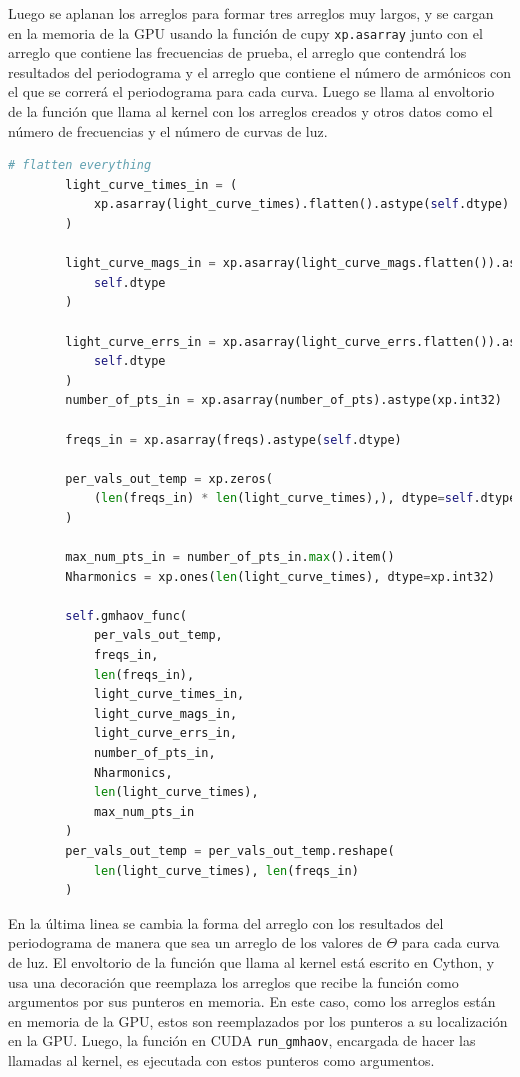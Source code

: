 Luego se aplanan los arreglos para formar tres arreglos muy largos, y se cargan en la memoria de la GPU usando la función de cupy \texttt{xp.asarray} junto con el arreglo que contiene las frecuencias de prueba, el arreglo que contendrá los resultados del periodograma y el arreglo que contiene el número de armónicos con el que se correrá el periodograma para cada curva. Luego se llama al envoltorio de la función que llama al kernel con los arreglos creados y otros datos como el número de frecuencias y el número de curvas de luz.
\begin{lstlisting}[language=Python]
        # flatten everything
        light_curve_times_in = (
            xp.asarray(light_curve_times).flatten().astype(self.dtype)
        )

        light_curve_mags_in = xp.asarray(light_curve_mags.flatten()).astype(
            self.dtype
        )

        light_curve_errs_in = xp.asarray(light_curve_errs.flatten()).astype(
            self.dtype
        )
        number_of_pts_in = xp.asarray(number_of_pts).astype(xp.int32)

        freqs_in = xp.asarray(freqs).astype(self.dtype)

        per_vals_out_temp = xp.zeros(
            (len(freqs_in) * len(light_curve_times),), dtype=self.dtype
        )

        max_num_pts_in = number_of_pts_in.max().item()
        Nharmonics = xp.ones(len(light_curve_times), dtype=xp.int32)

        self.gmhaov_func(
            per_vals_out_temp,
            freqs_in,
            len(freqs_in),
            light_curve_times_in,
            light_curve_mags_in,
            light_curve_errs_in,
            number_of_pts_in,
            Nharmonics,
            len(light_curve_times),
            max_num_pts_in
        )
        per_vals_out_temp = per_vals_out_temp.reshape(
            len(light_curve_times), len(freqs_in)
        )
\end{lstlisting}
En la última linea se cambia la forma del arreglo con los resultados del periodograma de manera que sea un arreglo de los valores de $\Theta$ para cada curva de luz.
El envoltorio de la función que llama al kernel está escrito en Cython, y usa una decoración que reemplaza los arreglos que recibe la función como argumentos por sus punteros en memoria. En este caso, como los arreglos están en memoria de la GPU, estos son reemplazados por los punteros a su localización en la GPU. Luego, la función en CUDA \texttt{run\_gmhaov}, encargada de hacer las llamadas al kernel, es ejecutada con estos punteros como argumentos.
